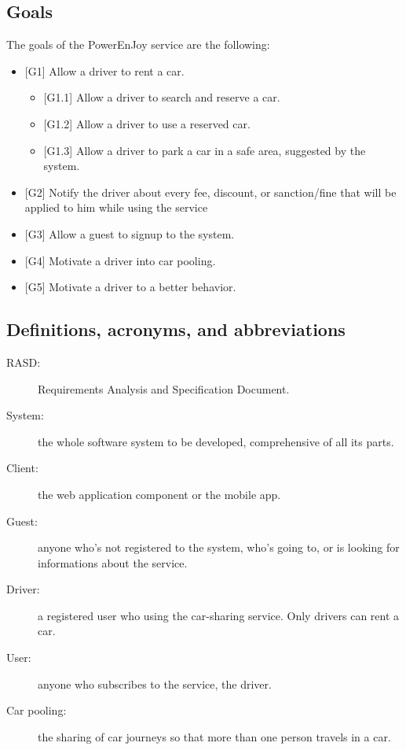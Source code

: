 \subsection{Goals}
The goals of the PowerEnJoy service are the following:
\begin{itemize}
	\item {[G1]} Allow a driver to rent a car.
	\begin{itemize}
		\item {[G1.1]} Allow a driver to search and reserve a car.
		\item {[G1.2]} Allow a driver to use a reserved car.
		\item {[G1.3]} Allow a driver to park a car in a safe area, suggested by the system.
	\end{itemize}
	\item {[G2]} Notify the driver about every fee, discount, or sanction/fine that will be applied to him while using the service
	\item {[G3]} Allow a guest to signup to the system.
	\item {[G4]} Motivate a driver into car pooling.
	\item {[G5]} Motivate a driver to a better behavior.
\end{itemize}

\subsection{Definitions, acronyms, and abbreviations}

\begin{description}
	\item[RASD:] Requirements Analysis and Specification Document.
	\item[System:] the whole software system to be developed, comprehensive of all its parts.
	\item[Client:] the web application component or the mobile app.
	\item[Guest:] anyone who's not registered to the system, who's going to, or is looking for informations about the service.
	\item[Driver:] a registered user who using the car-sharing service. Only drivers can rent a car.
	\item[User:] anyone who subscribes to the service, the driver.
	\item[Car pooling:] the sharing of car journeys so that more than one person travels in a car.
\end{description}

